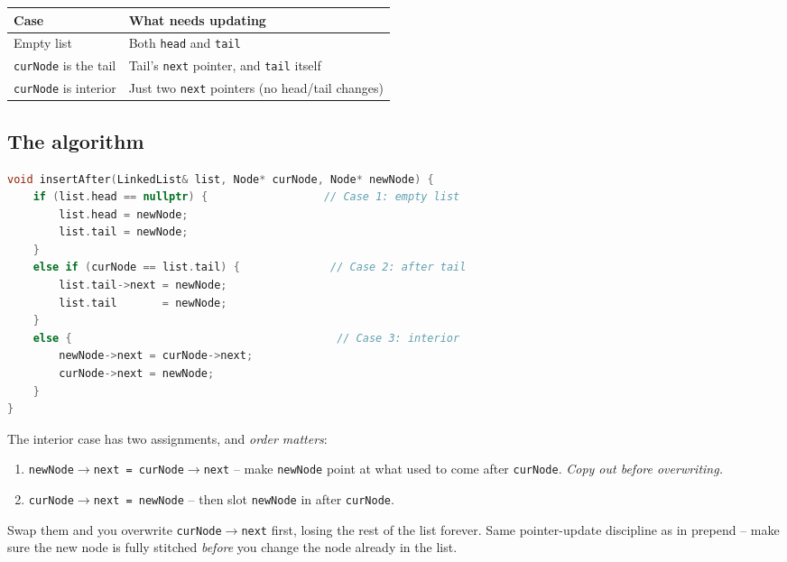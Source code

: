 \documentclass[11pt]{article}
\begin{document}
\begin{center}
\footnotesize
\renewcommand{\arraystretch}{1.3}
\begin{tabular}{@{}p{3.8cm}p{8.2cm}@{}}
\hline
\textbf{Case} & \textbf{What needs updating} \\
\hline
Empty list                    & Both \texttt{head} and \texttt{tail} \\
\texttt{curNode} is the tail  & Tail's \texttt{next} pointer, and \texttt{tail} itself \\
\texttt{curNode} is interior  & Just two \texttt{next} pointers (no head/tail changes) \\
\hline
\end{tabular}
\end{center}

\subsection{The algorithm}

\begin{examplebox}
\begin{lstlisting}[basicstyle=\ttfamily\small,frame=single,language=C++]
void insertAfter(LinkedList& list, Node* curNode, Node* newNode) {
    if (list.head == nullptr) {                  // Case 1: empty list
        list.head = newNode;
        list.tail = newNode;
    }
    else if (curNode == list.tail) {              // Case 2: after tail
        list.tail->next = newNode;
        list.tail       = newNode;
    }
    else {                                         // Case 3: interior
        newNode->next = curNode->next;
        curNode->next = newNode;
    }
}
\end{lstlisting}
\end{examplebox}

\begin{warnbox}
The interior case has two assignments, and \emph{order matters}:
\begin{enumerate}[leftmargin=*]
  \item \texttt{newNode$\to$next = curNode$\to$next} -- make
        \texttt{newNode} point at what used to come after
        \texttt{curNode}. \emph{Copy out before overwriting.}
  \item \texttt{curNode$\to$next = newNode} -- then slot
        \texttt{newNode} in after \texttt{curNode}.
\end{enumerate}
Swap them and you overwrite \texttt{curNode$\to$next} first, losing
the rest of the list forever. Same pointer-update discipline as in
prepend -- make sure the new node is fully stitched \emph{before}
you change the node already in the list.
\end{warnbox}
\end{document}
